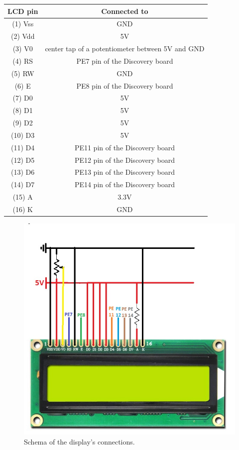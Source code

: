 \begin{tabular}{|c|c|}
	\hline 
	\textbf{LCD pin} & \textbf{Connected to} \\ 
	\hline 
	(1) Vss & GND \\ 
	\hline 
	(2) Vdd & 5V \\ 
	\hline 
	(3) V0 & center tap of a potentiometer between 5V and GND \\ 
	\hline 
	(4) RS & PE7 pin of the Discovery board \\ 
	\hline 
	(5) RW & GND \\ 
	\hline 
	(6) E & PE8 pin of the Discovery board \\ 
	\hline 
	(7) D0 & 5V \\ 
	\hline 
	(8) D1 & 5V \\ 
	\hline 
	(9) D2 & 5V \\ 
	\hline 
	(10) D3 & 5V \\ 
	\hline 
	(11) D4 & PE11 pin of the Discovery board \\ 
	\hline 
	(12) D5 & PE12 pin of the Discovery board \\ 
	\hline 
	(13) D6 & PE13 pin of the Discovery board \\ 
	\hline 
	(14) D7 & PE14 pin of the Discovery board \\ 
	\hline 
	(15) A & 3.3V \\ 
	\hline 
	(16) K & GND \\ 
	\hline 
\end{tabular} 

\begin{figure}[H]
	\centering
	\includegraphics[width=\textwidth]
	{files/images/display_connections.jpg}
	\caption{Schema of the display's connections.}
\end{figure}

